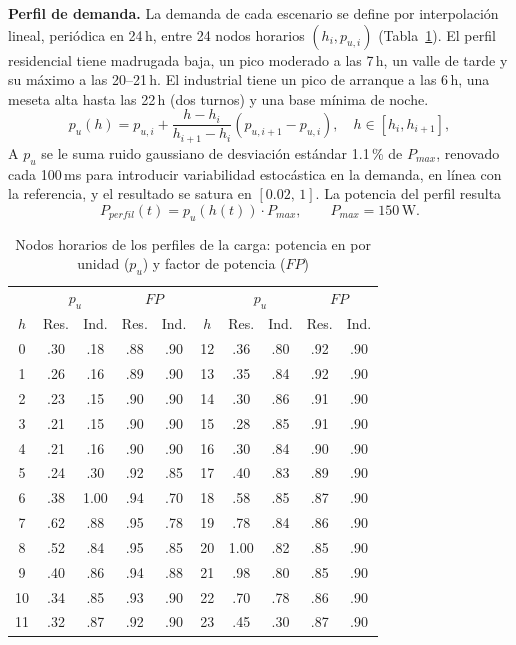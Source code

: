 \documentclass[conference]{IEEEtran}
\begin{document}
\textbf{Perfil de demanda.} La demanda de cada escenario se define por interpolación lineal, periódica en 24\,h, entre 24 nodos horarios $(h_i, p_{u,i})$ (Tabla~\ref{tab:carga_perfiles}). El perfil residencial tiene madrugada baja, un pico moderado a las 7\,h, un valle de tarde y su máximo a las 20--21\,h. El industrial tiene un pico de arranque a las 6\,h, una meseta alta hasta las 22\,h (dos turnos) y una base mínima de noche.
\begin{equation}
\label{eq:load_pu}
p_u(h) = p_{u,i} + \frac{h-h_i}{h_{i+1}-h_i}\left(p_{u,i+1}-p_{u,i}\right), \quad h\in[h_i,h_{i+1}],
\end{equation}
A $p_u$ se le suma ruido gaussiano de desviación estándar 1.1\,\% de $P_{max}$, renovado cada 100\,ms para introducir variabilidad estocástica en la demanda, en línea con la referencia, y el resultado se satura en $[0.02,\,1]$. La potencia del perfil resulta
\begin{equation}
\label{eq:load_Pperfil}
P_{perfil}(t) = p_u(h(t))\cdot P_{max}, \qquad P_{max}=150\,\text{W}.
\end{equation}


\begin{table}[H]
\caption{Nodos horarios de los perfiles de la carga: potencia en por unidad ($p_u$) y factor de potencia ($FP$)}
\label{tab:carga_perfiles}
\centering
\scriptsize
\setlength{\tabcolsep}{2.2pt}
\begin{tabular}{|c|cc|cc||c|cc|cc|}
\hline
 & \multicolumn{2}{c|}{$p_u$} & \multicolumn{2}{c||}{$FP$} & & \multicolumn{2}{c|}{$p_u$} & \multicolumn{2}{c|}{$FP$} \\
$h$ & Res. & Ind. & Res. & Ind. & $h$ & Res. & Ind. & Res. & Ind. \\
\hline
0 & .30 & .18 & .88 & .90 & 12 & .36 & .80 & .92 & .90 \\
1 & .26 & .16 & .89 & .90 & 13 & .35 & .84 & .92 & .90 \\
2 & .23 & .15 & .90 & .90 & 14 & .30 & .86 & .91 & .90 \\
3 & .21 & .15 & .90 & .90 & 15 & .28 & .85 & .91 & .90 \\
4 & .21 & .16 & .90 & .90 & 16 & .30 & .84 & .90 & .90 \\
5 & .24 & .30 & .92 & .85 & 17 & .40 & .83 & .89 & .90 \\
6 & .38 & 1.00 & .94 & .70 & 18 & .58 & .85 & .87 & .90 \\
7 & .62 & .88 & .95 & .78 & 19 & .78 & .84 & .86 & .90 \\
8 & .52 & .84 & .95 & .85 & 20 & 1.00 & .82 & .85 & .90 \\
9 & .40 & .86 & .94 & .88 & 21 & .98 & .80 & .85 & .90 \\
10 & .34 & .85 & .93 & .90 & 22 & .70 & .78 & .86 & .90 \\
11 & .32 & .87 & .92 & .90 & 23 & .45 & .30 & .87 & .90 \\
\hline
\end{tabular}
\end{table}
\end{document}

